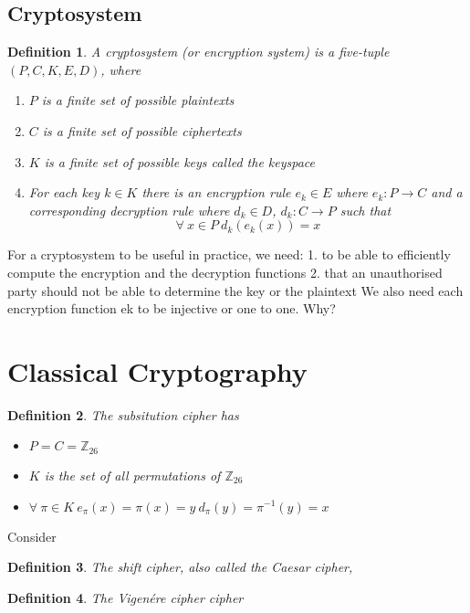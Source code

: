\documentclass{article}
\theoremstyle{quest}
\newtheorem*{definition}{Definition}
\newcommand{\Z}{\mathbb{Z}}
\begin{document}
\subsection{Cryptosystem}
\begin{definition}
	A \textit{cryptosystem} (or encryption system) is a five-tuple $(P,C,K,E,D)$, where
	\begin{enumerate}
		\item $P$ is a finite set of possible plaintexts
		\item $C$ is a finite set of possible ciphertexts
		\item $K$ is a finite set of possible keys called the keyspace
		\item For each key $k \in K$
			there is an encryption rule $e_k \in E$ where $e_k : P \rightarrow C$
			and a corresponding decryption rule where $d_k \in D$, $d_k : C \rightarrow P$
			such that
			$$\forall\ x \in P\ d_k(e_k(x)) = x$$
		\end{enumerate}
\end{definition}

For a cryptosystem to be useful in practice, we need:
1. to be able to efficiently compute the encryption and the decryption functions
2. that an unauthorised party should not be able to determine the key or the plaintext
We also need each encryption function ek to be injective or one to one. Why?

\section{Classical Cryptography}
\begin{definition}
	The \textit{subsitution cipher} has
	\begin{itemize}
		\item $P = C = \Z_{26}$
		\item $K$ is the set of all permutations of $\Z_{26}$
		\item
			$
			\forall\ \pi \in K
			\ e_\pi(x) = \pi(x) = y
			\ d_\pi(y) = \pi^{-1}(y) = x
			$
	\end{itemize}
\end{definition}

Consider

\begin{definition}
	The \textit{shift cipher}, also called the Caesar cipher,
\end{definition}

\begin{definition}
	The \textit{Vigen\'ere cipher cipher}
\end{definition}
\end{document}
